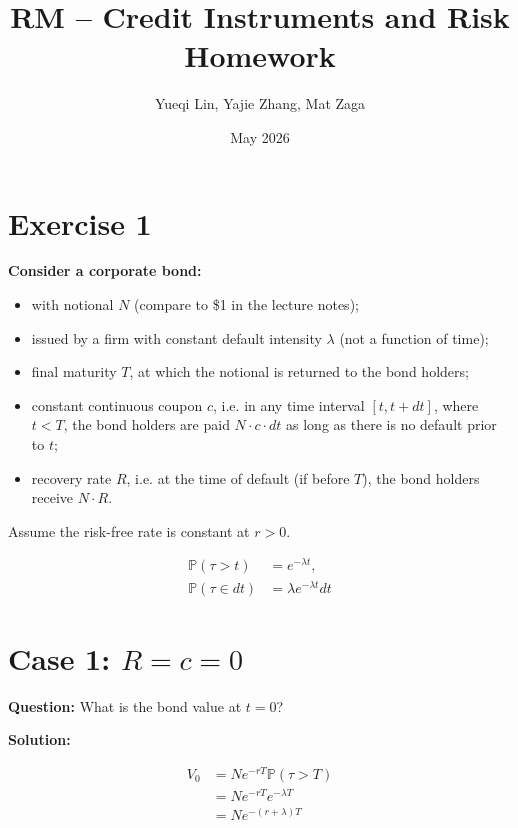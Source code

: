 \documentclass{article}
\title{RM -- Credit Instruments and Risk Homework}
\author{Yueqi Lin, Yajie Zhang, Mat Zaga}
\date{May 2026}
\begin{document}
\maketitle

\section{Exercise 1}

\textbf{Consider a corporate bond:}
\begin{itemize}
    \item with notional $N$ (compare to \$1 in the lecture notes);
    \item issued by a firm with constant default intensity $\lambda$ (not a function of time);
    \item final maturity $T$, at which the notional is returned to the bond holders;
    \item constant continuous coupon $c$, i.e. in any time interval $[t, t+dt]$, where $t < T$, the bond holders are paid $N \cdot c \cdot dt$ as long as there is no default prior to $t$;
    \item recovery rate $R$, i.e. at the time of default (if before $T$), the bond holders receive $N \cdot R$.
\end{itemize}

Assume the risk-free rate is constant at $r > 0$.

\begin{align*}
\mathbb{P}(\tau > t) &= e^{-\lambda t}, \\
\mathbb{P}(\tau \in dt) &= \lambda e^{-\lambda t} dt
\end{align*}


\section*{Case 1: $R = c = 0$}

\textbf{Question:} What is the bond value at $t = 0$?

\vspace{4pt}

\textbf{Solution:}

\begin{align*}
V_0 &= N e^{-rT} \mathbb{P}(\tau > T) \\
    &= N e^{-rT} e^{-\lambda T} \\
    &= N e^{-(r+\lambda)T}
\end{align*}
\end{document}
